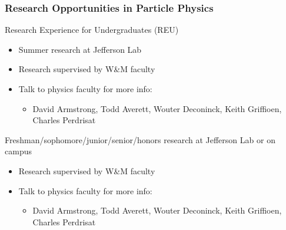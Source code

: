 \begin{frame}
 \frametitle{Research Opportunities in Particle Physics}
 \begin{block}{Research Experience for Undergraduates (REU)}
  \begin{itemize}
   \item Summer research at Jefferson Lab
   \item Research supervised by W\&M faculty
   \item Talk to physics faculty for more info:
    \begin{itemize}
     \item David Armstrong, Todd Averett, Wouter Deconinck, Keith Griffioen, Charles Perdrisat
    \end{itemize}
  \end{itemize}
 \end{block}
 \begin{block}{Freshman/sophomore/junior/senior/honors research at Jefferson Lab or on campus}
  \begin{itemize}
   \item Research supervised by W\&M faculty
   \item Talk to physics faculty for more info:
    \begin{itemize}
     \item David Armstrong, Todd Averett, Wouter Deconinck, Keith Griffioen, Charles Perdrisat
    \end{itemize}
  \end{itemize}
 \end{block}
\end{frame}
